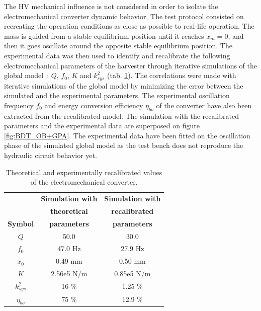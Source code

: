 \documentclass[3p,twocolumn,preprint]{elsarticle}
\begin{document}
The HV mechanical influence is not considered in order to isolate the electromechanical converter dynamic behavior. The test protocol consisted on recreating the operation conditions as close as possible to real-life operation. The mass is guided from a stable equilibrium position until it reaches \mbox{$x_m=0$}, and then it goes oscillate around the opposite stable equilibrium position. The experimental data was then used to identify and recalibrate the following electromechanical parameters of the harvester through iterative simulations of the global \mbox{model :} $Q$, $f_0$, $K$ and $k_{sys}^2$ (tab. \ref{tab:parametres_lacher_free}). The correlations were made with iterative simulations of the global model by minimizing the error between the simulated and the experimental parameters. The experimental oscillation frequency $f_0$ and energy conversion efficiency $\eta_{bo}$ of the converter have also been extracted from the recalibrated model. The simulation with the recalibrated parameters and the experimental data are superposed on figure \ref{fig:BDT_OB+GPA}. The experimental data have been fitted on the oscillation phase of the simulated global model as the test bench does not reproduce the hydraulic circuit behavior yet.
\begin{table}[!htbp]
\centering
\captionsetup{justification=centering}
	\begin{tabular}{ c | c | c }
	\toprule
	& \textbf{Simulation with}  	   & \textbf{Simulation with}       \\
	& \textbf{theoretical}  		   & \textbf{recalibrated }		 	\\
	\multirow{-3}{*}{\textbf{Symbol}}
	& \textbf{parameters}			   & \textbf{parameters} 			\\
	\midrule
	$Q$                       & 50.0                  & 30.0 		  	\\  
	$f_0$                     & 47.0 Hz               & 27.9 Hz  		\\
	$x_0$                     & 0.49 mm               & 0.50 mm    		\\
	$K$                       & 2.56e5 N/m            & 0.85e5 N/m 		\\
	${k^2_{sys}}$             & 16 \%                 & 1.25 \% 		\\
	$\eta_{bo}$               & 75 \%                 & 12.9 \%   		\\
	\bottomrule
	\end{tabular}
	\caption{Theoretical and experimentally recalibrated values of the electromechanical converter.}
	\label{tab:parametres_lacher_free}
\end{table} 
\end{document}
